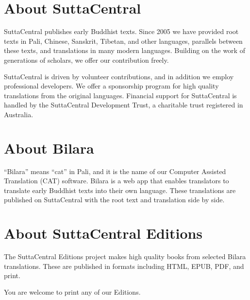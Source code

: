 \documentclass[12pt,openany]{book}%
\begin{document}
\section*{About SuttaCentral}

SuttaCentral publishes early Buddhist texts. Since 2005 we have provided root texts in Pali, Chinese, Sanskrit, Tibetan, and other languages, parallels between these texts, and translations in many modern languages. Building on the work of generations of scholars, we offer our contribution freely.

SuttaCentral is driven by volunteer contributions, and in addition we employ professional developers. We offer a sponsorship program for high quality translations from the original languages. Financial support for SuttaCentral is handled by the SuttaCentral Development Trust, a charitable trust registered in Australia.

\section*{About Bilara}

“Bilara” means “cat” in Pali, and it is the name of our Computer Assisted Translation (CAT) software. Bilara is a web app that enables translators to translate early Buddhist texts into their own language. These translations are published on SuttaCentral with the root text and translation side by side.

\section*{About SuttaCentral Editions}

The SuttaCentral Editions project makes high quality books from selected Bilara translations. These are published in formats including HTML, EPUB, PDF, and print.

You are welcome to print any of our Editions.

%
\end{document}
